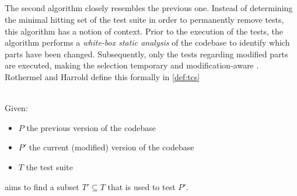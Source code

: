 
\subsection{\tcs{}}
The second algorithm closely resembles the previous one. Instead of determining the minimal hitting set of the test suite in order to permanently remove tests, this algorithm has a notion of context. Prior to the execution of the tests, the algorithm performs a \emph{white-box static analysis} of the codebase to identify which parts have been changed. Subsequently, only the tests regarding modified parts are executed, making the selection temporary and modification-aware \cite{10.1002/stv.430}. Rothermel and Harrold define this formally in \autoref{def:tcs}

\begin{definition}[\tcs{}]
\label{def:tcs}
\mbox{}\\Given:
\begin{itemize}
	\item $P$ the previous version of the codebase
	\item $P'$ the current (modified) version of the codebase
	\item $T$ the test suite
\end{itemize}

\noindent \tcs{} aims to find a subset $T' \subseteq T$ that is used to test $P'$. 
\end{definition}